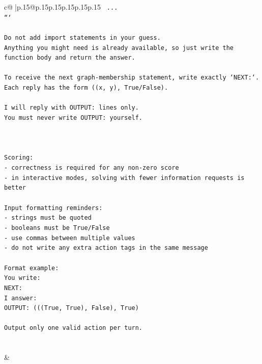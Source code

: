 \documentclass{article}
\begin{document}
{\begin{supertabular}{c@{$\;$}|p{.15\linewidth}@{}p{.15\linewidth}p{.15\linewidth}p{.15\linewidth}p{.15\linewidth}p{.15\linewidth}}
{{{\texttt{    ...} \\
\texttt{```} \\
\\ 
\texttt{Do not add import statements in your guess.} \\
\texttt{Anything you might need is already available, so just write the function body and return the answer.} \\
\\ 
\texttt{To receive the next graph{-}membership statement, write exactly `NEXT:`.} \\
\texttt{Each reply has the form ((x, y), True/False).} \\
\\ 
\texttt{I will reply with OUTPUT: lines only.} \\
\texttt{You must never write OUTPUT: yourself.} \\
\\ 
\\ 
\\ 
\texttt{Scoring:} \\
\texttt{{-} correctness is required for any non{-}zero score} \\
\texttt{{-} in interactive modes, solving with fewer information requests is better} \\
\\ 
\texttt{Input formatting reminders:} \\
\texttt{{-} strings must be quoted} \\
\texttt{{-} booleans must be True/False} \\
\texttt{{-} use commas between multiple values} \\
\texttt{{-} do not write any extra action tags in the same message} \\
\\ 
\texttt{Format example:} \\
\texttt{You write:} \\
\texttt{NEXT:} \\
\texttt{I answer:} \\
\texttt{OUTPUT: (((True, True), False), True)} \\
\\ 
\texttt{Output only one valid action per turn.} \\
            }
        }
    }
     \\ \\

    \theutterance {}  
    & 
\end{supertabular}}
\end{document}
